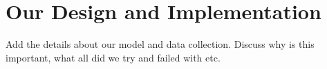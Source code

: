 \vspace{0.2in}
\section{Our Design and Implementation}
\label{sec:design}
Add the details about our model and data collection. Discuss why is this important, what all did we try and failed with etc.
